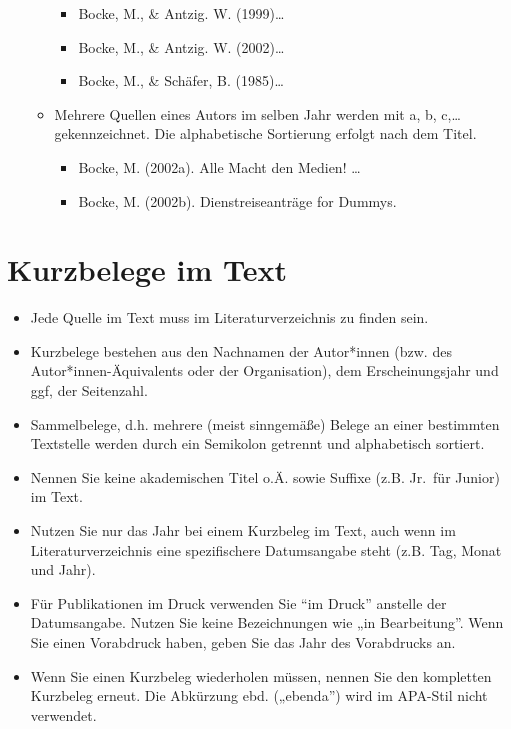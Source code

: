 \documentclass[
  letterpaper,
  DIV=11]{scrreprt}
\begin{document}
\begin{itemize}
\begin{itemize}
    \begin{itemize}
    \item
      Bocke, M., \& Antzig. W. (1999)\ldots{}
    \item
      Bocke, M., \& Antzig. W. (2002)\ldots{}
    \item
      Bocke, M., \& Schäfer, B. (1985)\ldots{}
    \end{itemize}
  \item
    Mehrere Quellen eines Autors im selben Jahr werden mit a, b,
    c,\ldots{} gekennzeichnet. Die alphabetische Sortierung erfolgt nach
    dem Titel.

    \begin{itemize}
    \item
      Bocke, M. (2002a). Alle Macht den Medien! \ldots{}
    \item
      Bocke, M. (2002b). Dienstreiseanträge for Dummys.
    \end{itemize}
  \end{itemize}
\end{itemize}

\section{Kurzbelege im Text}\label{kurzbelege-im-text}

\begin{itemize}
\item
  Jede Quelle im Text muss im Literaturverzeichnis zu finden sein.
\item
  Kurzbelege bestehen aus den Nachnamen der Autor*innen (bzw. des
  Autor*innen-Äquivalents oder der Organisation), dem Erscheinungsjahr
  und ggf, der Seitenzahl.
\item
  Sammelbelege, d.h. mehrere (meist sinngemäße) Belege an einer
  bestimmten Textstelle werden durch ein Semikolon getrennt und
  alphabetisch sortiert.
\item
  Nennen Sie keine akademischen Titel o.Ä. sowie Suffixe (z.B. Jr.~für
  Junior) im Text.
\item
  Nutzen Sie nur das Jahr bei einem Kurzbeleg im Text, auch wenn im
  Literaturverzeichnis eine spezifischere Datumsangabe steht (z.B. Tag,
  Monat und Jahr).
\item
  Für Publikationen im Druck verwenden Sie ``im Druck'' anstelle der
  Datumsangabe. Nutzen Sie keine Bezeichnungen wie „in Bearbeitung''.
  Wenn Sie einen Vorabdruck haben, geben Sie das Jahr des Vorabdrucks
  an.
\item
  Wenn Sie einen Kurzbeleg wiederholen müssen, nennen Sie den kompletten
  Kurzbeleg erneut. Die Abkürzung ebd. („ebenda'') wird im APA-Stil
  nicht verwendet.
\end{itemize}
\end{document}
